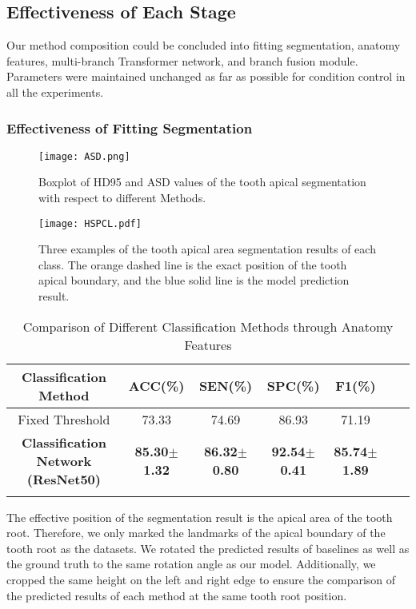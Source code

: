 \documentclass[journal]{IEEEtran}
\begin{document}
\subsection{Effectiveness of Each Stage}
Our method composition could be concluded into fitting segmentation, anatomy features, multi-branch Transformer network, and branch fusion module. Parameters were maintained unchanged as far as possible for condition control in all the experiments. 

    

\subsubsection{Effectiveness of Fitting Segmentation}


\begin{figure*}[ht]
\centering
  \texttt{[image: ASD.png]}
  \caption{Boxplot of HD95 and ASD values of the tooth apical segmentation with respect to different Methods.}
  \label{fig:asd}
\end{figure*}


\begin{figure*}[ht]
\centering
  \texttt{[image: HSPCL.pdf]}
  \caption{Three examples of the tooth apical area segmentation results of each class. The orange dashed line is the exact position of the tooth apical boundary, and the blue solid line is the model prediction result.}
  \label{fig:segmentation results}
\end{figure*}


\begin{table*}[ht]
\centering
\renewcommand\arraystretch{1.2}
\setlength{\tabcolsep}{6mm}
\caption{Comparison of Different Classification Methods through Anatomy Features}
\begin{tabular}{c|cccccc}
\Xhline{1pt}
Classification Method     & ACC(\%) & SEN(\%) & SPC(\%) & F1(\%)   \\ \hline
Fixed Threshold & 73.33   & 74.69   & 86.93   & 71.19 \\ \hline
\textbf{Classification Network (ResNet50)}   & \textbf{85.30$\pm$1.32}    & \textbf{86.32$\pm$0.80}   & \textbf{92.54$\pm$0.41}   & \textbf{85.74$\pm$1.89}     \\ \Xhline{1pt}
\end{tabular}
\label{tab3}
\end{table*}




The effective position of the segmentation result is the apical area of the tooth root. Therefore, we only marked the landmarks of the apical boundary of the tooth root as the datasets. We rotated the predicted results of baselines as well as the ground truth to the same rotation angle as our model. Additionally, we cropped the same height on the left and right edge to ensure the comparison of the predicted results of each method at the same tooth root position.
\end{document}
